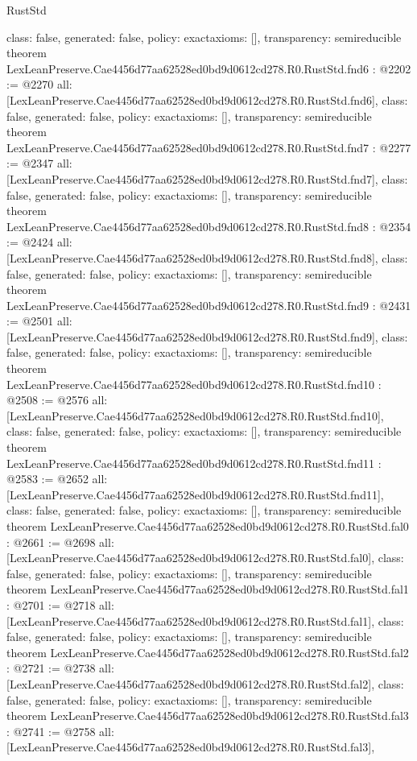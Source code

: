 \begin{lexlean}{RustStd}
\begin{coremodule}
{  class: false,
  generated: false,
  policy: exact{axioms: []},
  transparency: semireducible
}
theorem LexLeanPreserve.Cae4456d77aa62528ed0bd9d0612cd278.R0.RustStd.fnd6 : @2202 := @2270 {
  all: [LexLeanPreserve.Cae4456d77aa62528ed0bd9d0612cd278.R0.RustStd.fnd6],
  class: false,
  generated: false,
  policy: exact{axioms: []},
  transparency: semireducible
}
theorem LexLeanPreserve.Cae4456d77aa62528ed0bd9d0612cd278.R0.RustStd.fnd7 : @2277 := @2347 {
  all: [LexLeanPreserve.Cae4456d77aa62528ed0bd9d0612cd278.R0.RustStd.fnd7],
  class: false,
  generated: false,
  policy: exact{axioms: []},
  transparency: semireducible
}
theorem LexLeanPreserve.Cae4456d77aa62528ed0bd9d0612cd278.R0.RustStd.fnd8 : @2354 := @2424 {
  all: [LexLeanPreserve.Cae4456d77aa62528ed0bd9d0612cd278.R0.RustStd.fnd8],
  class: false,
  generated: false,
  policy: exact{axioms: []},
  transparency: semireducible
}
theorem LexLeanPreserve.Cae4456d77aa62528ed0bd9d0612cd278.R0.RustStd.fnd9 : @2431 := @2501 {
  all: [LexLeanPreserve.Cae4456d77aa62528ed0bd9d0612cd278.R0.RustStd.fnd9],
  class: false,
  generated: false,
  policy: exact{axioms: []},
  transparency: semireducible
}
theorem LexLeanPreserve.Cae4456d77aa62528ed0bd9d0612cd278.R0.RustStd.fnd10 : @2508 := @2576 {
  all: [LexLeanPreserve.Cae4456d77aa62528ed0bd9d0612cd278.R0.RustStd.fnd10],
  class: false,
  generated: false,
  policy: exact{axioms: []},
  transparency: semireducible
}
theorem LexLeanPreserve.Cae4456d77aa62528ed0bd9d0612cd278.R0.RustStd.fnd11 : @2583 := @2652 {
  all: [LexLeanPreserve.Cae4456d77aa62528ed0bd9d0612cd278.R0.RustStd.fnd11],
  class: false,
  generated: false,
  policy: exact{axioms: []},
  transparency: semireducible
}
theorem LexLeanPreserve.Cae4456d77aa62528ed0bd9d0612cd278.R0.RustStd.fal0 : @2661 := @2698 {
  all: [LexLeanPreserve.Cae4456d77aa62528ed0bd9d0612cd278.R0.RustStd.fal0],
  class: false,
  generated: false,
  policy: exact{axioms: []},
  transparency: semireducible
}
theorem LexLeanPreserve.Cae4456d77aa62528ed0bd9d0612cd278.R0.RustStd.fal1 : @2701 := @2718 {
  all: [LexLeanPreserve.Cae4456d77aa62528ed0bd9d0612cd278.R0.RustStd.fal1],
  class: false,
  generated: false,
  policy: exact{axioms: []},
  transparency: semireducible
}
theorem LexLeanPreserve.Cae4456d77aa62528ed0bd9d0612cd278.R0.RustStd.fal2 : @2721 := @2738 {
  all: [LexLeanPreserve.Cae4456d77aa62528ed0bd9d0612cd278.R0.RustStd.fal2],
  class: false,
  generated: false,
  policy: exact{axioms: []},
  transparency: semireducible
}
theorem LexLeanPreserve.Cae4456d77aa62528ed0bd9d0612cd278.R0.RustStd.fal3 : @2741 := @2758 {
  all: [LexLeanPreserve.Cae4456d77aa62528ed0bd9d0612cd278.R0.RustStd.fal3],
}
\end{coremodule}
\end{lexlean}
